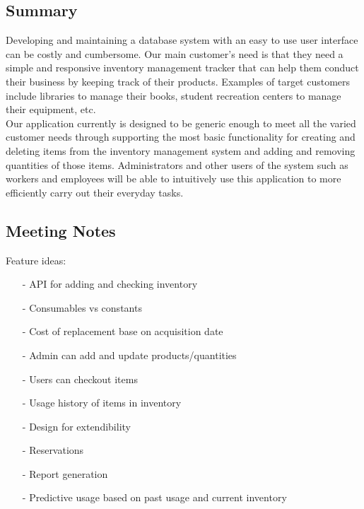 \documentclass{article}
\begin{document}
         \subsection{Summary}
                Developing and maintaining a database system with an easy to use user interface can be costly and cumbersome. Our main customer’s need is that they need a simple and responsive inventory management tracker that can help them conduct their business by keeping track of their products. Examples of target customers include libraries to manage their books, student recreation centers to manage their equipment, etc.\\

                \noindent Our application currently is designed to be generic enough to meet all the varied customer needs through supporting the most basic functionality for creating and deleting items from the inventory management system and adding and removing quantities of those items. Administrators and other users of the system such as workers and employees will be able to intuitively use this application to more efficiently carry out their everyday tasks.    
            
        \subsection{Meeting Notes}
            Feature ideas:
            \begin{itemize}
                \item[-] API for adding and checking inventory
                \item[-] Consumables vs constants
                \item[-] Cost of replacement base on acquisition date
                \item[-] Admin can add and update products/quantities
                \item[-] Users can checkout items
                \item[-] Usage history of items in inventory
                \item[-] Design for extendibility
                \item[-] Reservations
                \item[-] Report generation
                \item[-] Predictive usage based on past usage and current inventory
            \end{itemize}
            
\end{document}
